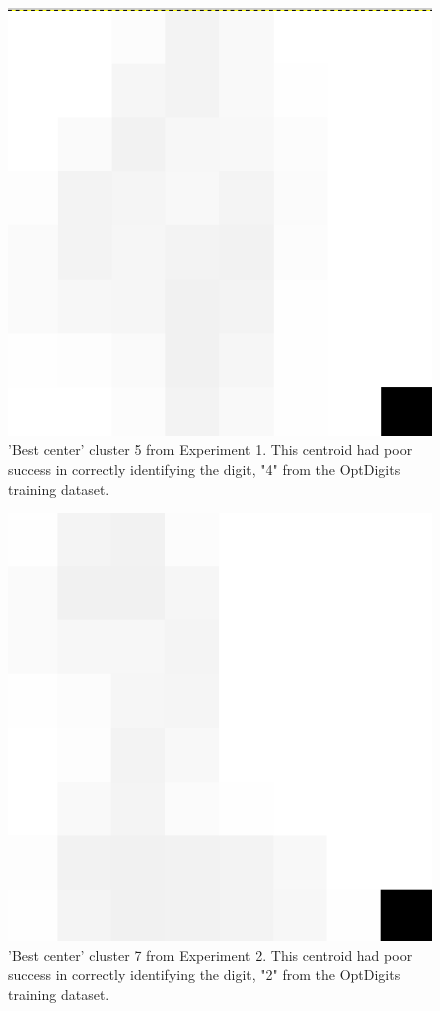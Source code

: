 \documentclass[12pt]{article}
\begin{document}
 
\begin{figure}
   	\begin{center}
   		\includegraphics[scale=0.5]{Screenshot_Exp1dig5}
   		\caption{'Best center' cluster 5 from Experiment 1. This centroid had poor success in correctly identifying the digit, "4" from the OptDigits training dataset. }
   		\label{fig:a3}
   	\end{center}
   \end{figure}   

\begin{figure}  
	\begin{center}
  	 \includegraphics[scale=0.5]{Screenshot_Exp2dig7}
   		\caption{'Best center' cluster 7 from Experiment 2. This centroid had poor success in correctly identifying the digit, "2" from the OptDigits training dataset.}
   		\label{fig:a4}
   	\end{center}
   \end{figure}
\end{document}
